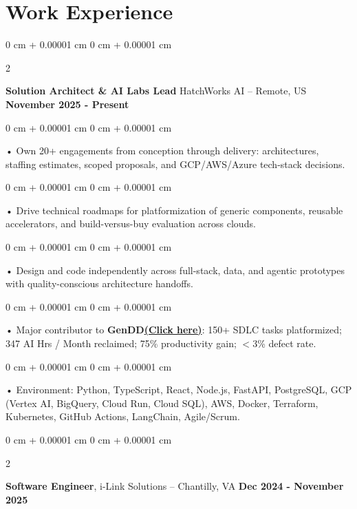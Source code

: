 \documentclass[10pt, letterpaper]{article}
\newenvironment{onecolentry}{
    \begin{adjustwidth}{
        0 cm + 0.00001 cm
    }{
        0 cm + 0.00001 cm
    }
}{
    \end{adjustwidth}
} %
\newenvironment{twocolentry}[2][]{
    \onecolentry
    \def\secondColumn{#2}
    \setcolumnwidth{\fill, 4.5 cm}
    \begin{paracol}{2}
}{
    \switchcolumn \raggedleft \secondColumn
    \end{paracol}
    \endonecolentry
} %
\begin{document}
    \vspace{2 pt }
    \section{Work Experience}
        \vspace{0.1cm}

        \begin{twocolentry}{
            \textbf{November 2025 - Present}
        }
            \textbf{Solution Architect \& AI Labs Lead} HatchWorks AI -- Remote, US\end{twocolentry}

        \begin{onecolentry}
             • Own 20+ engagements from conception through delivery: architectures, staffing estimates, scoped proposals, and GCP/AWS/Azure tech-stack decisions.
        \end{onecolentry}
        \begin{onecolentry}
             • Drive technical roadmaps for platformization of generic components, reusable accelerators, and build-versus-buy evaluation across clouds.
        \end{onecolentry}
        \begin{onecolentry}
             • Design and code independently across full-stack, data, and agentic prototypes with quality-conscious architecture handoffs.
        \end{onecolentry}
        \begin{onecolentry}
             • Major contributor to \textbf{GenDD}\href{https://hatchworks.com/generative-driven-development/}{\textbf{(Click here)}}: 150+ SDLC tasks platformized; 347 AI Hrs / Month reclaimed; 75\% productivity gain; $<$3\% defect rate.
        \end{onecolentry}
        \begin{onecolentry}
             • Environment: Python, TypeScript, React, Node.js, FastAPI, PostgreSQL, GCP (Vertex AI, BigQuery, Cloud Run, Cloud SQL), AWS, Docker, Terraform, Kubernetes, GitHub Actions, LangChain, Agile/Scrum.
        \end{onecolentry}

        \vspace{0.1cm}

        \begin{twocolentry}{
            \textbf{Dec 2024 - November 2025}
        }
            \textbf{Software Engineer}, i-Link Solutions -- Chantilly, VA\end{twocolentry}
\end{document}
